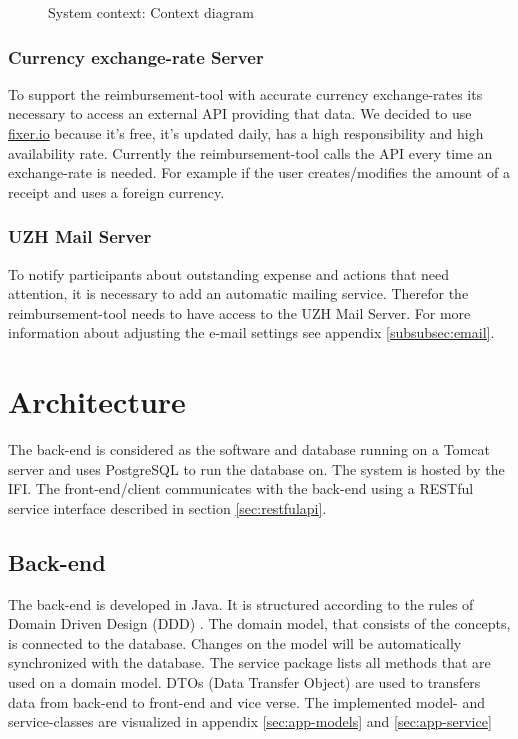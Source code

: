 \begin{figure}[H]
    \centering
    \caption{System context: Context diagram}
    \label{fig:context-diagram}
\end{figure}

\subsubsection{Currency exchange-rate Server}

To support the reimbursement-tool with accurate currency exchange-rates its necessary to access an external API providing that data. We decided to use \url{fixer.io} \cite{fixer} because it's free, it's updated daily, has a high responsibility and high availability rate. Currently the reimbursement-tool calls the API every time an exchange-rate is needed. For example if the user creates/modifies the amount of a receipt and uses a foreign currency.

\subsubsection{UZH Mail Server}

To notify participants about outstanding expense and actions that need attention, it is necessary to add an automatic mailing service. Therefor the reimbursement-tool needs to have access to the UZH Mail Server. For more information about adjusting the e-mail settings see appendix \ref{subsubsec:email}.\newpage


\section{Architecture}

The back-end is considered as the software and database running on a Tomcat \cite{tomcat} server and uses PostgreSQL \cite{postgresql} to run the database on. The system is hosted by the IFI. The front-end/client communicates with the back-end using a RESTful service interface described in section \ref{sec:restfulapi}.

\subsection{Back-end}
The back-end is developed in Java. It is structured according to the rules of Domain Driven Design (DDD) \cite{ddd}. The domain model, that consists of the concepts, is connected to the database. Changes on the model will be automatically synchronized with the database. The service package lists all methods that are used on a domain model.\newline
DTOs (Data Transfer Object) are used to transfers data from back-end to front-end and vice verse. \newline The implemented model- and service-classes are visualized in appendix \ref{sec:app-models} and \ref{sec:app-service}

